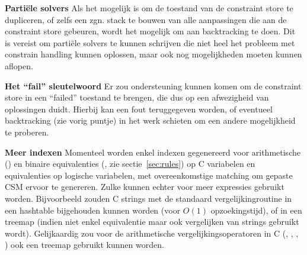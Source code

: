 {\bf Parti\"ele solvers} Als het mogelijk is om de toestand van de constraint store te dupliceren, of zelfs een zgn. stack te bouwen van alle aanpassingen die aan de constraint store gebeuren, wordt het mogelijk om aan backtracking te doen. Dit is vereist om parti\"ele solvers te kunnen schrijven die niet heel het probleem met constrain handling kunnen oplossen, maar ook nog mogelijkheden moeten kunnen aflopen.

{\bf Het ``fail'' sleutelwoord} Er zou ondersteuning kunnen komen om de constraint store in een ``failed'' toestand te brengen, die dus op een afwezigheid van oplossingen duidt. Hierbij kan een fout teruggegeven worden, of eventueel backtracking (zie vorig puntje) in het werk schieten om een andere mogelijkheid te proberen.

{\bf Meer indexen} Momenteel worden enkel indexen gegenereerd voor arithmetische (\code{==}) en binaire equivalenties (, zie sectie~\ref{sec:rules}) op C variabelen en equivalenties op logische variabelen, met overeenkomstige matching om gepaste CSM ervoor te genereren. Zulke kunnen echter voor meer expressies gebruikt worden. Bijvoorbeeld zouden C strings met de standaard vergelijkingroutine  in een hashtable bijgehouden kunnen worden (voor $O(1)$ opzoekingstijd), of in een treemap (indien niet enkel equivalentie maar ook vergelijken van strings gebruikt wordt). Gelijkaardig zou voor de arithmetische vergelijkingsoperatoren in C (\code{>}, \code{<}, \code{>=}, \code{<=}) ook een treemap gebruikt kunnen worden.
